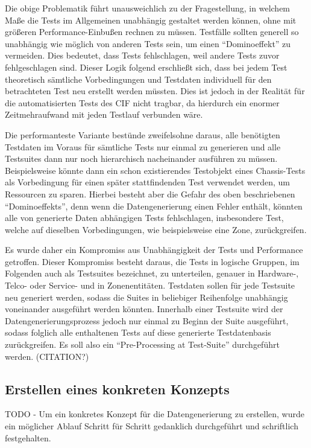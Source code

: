Die obige Problematik führt unausweichlich zu der Fragestellung, in welchem Maße die Tests im Allgemeinen unabhängig gestaltet werden können, ohne mit größeren Performance-Einbußen rechnen zu müssen. Testfälle sollten generell so unabhängig wie möglich von anderen Tests sein, um einen \enquote{Dominoeffekt} zu vermeiden. Dies bedeutet, dass Tests fehlschlagen, weil andere Tests zuvor fehlgeschlagen sind. \cite[S. 197]{fewster:1999} Dieser Logik folgend erschließt sich, dass bei jedem Test theoretisch sämtliche Vorbedingungen und Testdaten individuell für den betrachteten Test neu erstellt werden müssten. Dies ist jedoch in der Realität für die automatisierten Tests des \ac{CIF} nicht tragbar, da hierdurch ein enormer Zeitmehraufwand mit jeden Testlauf verbunden wäre. 

Die performanteste Variante bestünde zweifelsohne daraus, alle benötigten Testdaten im Voraus für sämtliche Tests nur einmal zu generieren und alle Testsuites dann nur noch hierarchisch nacheinander ausführen zu müssen. Beispielsweise könnte dann ein schon existierendes Testobjekt eines Chassis-Tests als Vorbedingung für einen später stattfindenden Test verwendet werden, um Ressourcen zu sparen. Hierbei besteht aber die Gefahr des oben beschriebenen \enquote{Dominoeffekts}, denn wenn die Datengenerierung einen Fehler enthält, könnten alle von generierte Daten abhängigen Tests fehlschlagen, insbesondere Test, welche auf dieselben Vorbedingungen, wie beispielsweise eine Zone, zurückgreifen. 

Es wurde daher ein Kompromiss aus Unabhängigkeit der Tests und Performance getroffen. Dieser Kompromiss besteht daraus, die Tests in logische Gruppen, im Folgenden auch als Testsuites bezeichnet, zu unterteilen, genauer in Hardware-, Telco- oder Service- und in Zonenentitäten. Testdaten sollen für jede Testsuite neu generiert werden, sodass die Suites in beliebiger Reihenfolge unabhängig voneinander ausgeführt werden könnten. Innerhalb einer Testsuite wird der Datengenerierungsprozess jedoch nur einmal zu Beginn der Suite ausgeführt, sodass folglich alle enthaltenen Tests auf diese generierte Testdatenbasis zurückgreifen. Es soll also ein \enquote{Pre-Processing at Test-Suite} durchgeführt werden. (CITATION?)

\subsection{Erstellen eines konkreten Konzepts}\label{subsec:konzept}
TODO - Um ein konkretes Konzept für die Datengenerierung zu erstellen, wurde ein möglicher Ablauf Schritt für Schritt gedanklich durchgeführt und schriftlich festgehalten.

